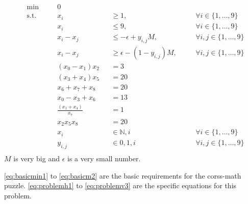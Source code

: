 \documentclass[parskip=half]{scrartcl}
\newcommand{\onetonine}{\{1,\ldots,9\}}
\begin{document}
\begin{align}
&\min \quad &&0 \\
& \text{s.t.} \quad 
  && x_i 			&&\geq 1, 		&&\quad \forall i \in \onetonine \label{eq:basicmin1} \\
& && x_i 			&&\leq 9,  		&&\quad \forall i \in \onetonine \label{eq:basicmax9} \\
& && x_i - x_j 	&&\leq -\epsilon + y_{i,j} M, && \quad \forall i,j \in \onetonine \label{eq:basicm1}\\
& && x_i - x_j 	&&\geq \epsilon - (1-y_{i,j}) M, && \quad \forall i,j \in \onetonine \label{eq:basicm2}\\
& && (x_0 - x_1) x_2  &&= 3 \label{eq:problemh1} \\
& && (x_3 + x_4) x_5  &&= 20 \label{eq:problemh2} \\
& && x_6  + x_7 + x_8 &&= 20 \label{eq:problemh3} \\
& && x_0 - x_3 + x_6  &&= 13 \label{eq:problemv1} \\
& && \frac{(x_1 + x_4)}{x_7} &&= 1 \label{eq:problemv2} \\
& && x_2  x_5  x_8 &&= 20 \label{eq:problemv3} \\
& && x_i 		&&\in \mathbb{N}, i && \quad \forall i \in \onetonine \\
& && y_{i,j} 		&&\in {0,1}, i && \quad \forall i,j \in \onetonine \\
\end{align}
$M$ is very big and $\epsilon$ is a very small number.

\autoref{eq:basicmin1} to \autoref{eq:basicm2} are the basic requirements for the corss-math puzzle. \autoref{eq:problemh1} to \autoref{eq:problemv3} are the specific equations for this problem.

\end{document}
